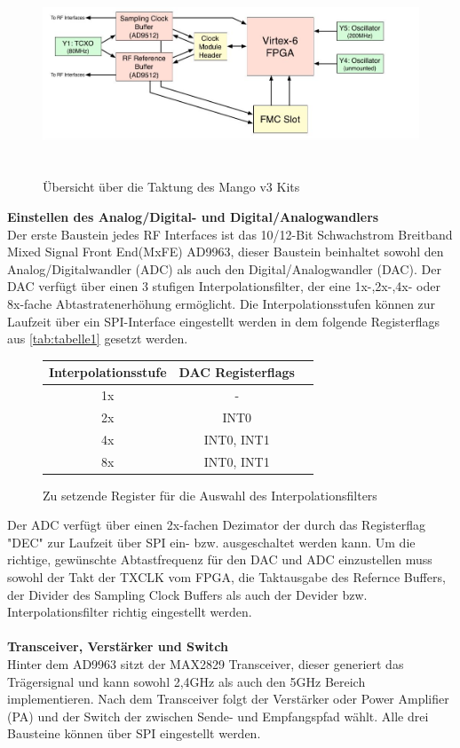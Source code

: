 \documentclass[letterpaper,11pt,ngerman]{article}
\begin{document}
\begin{onehalfspace}
\begin{figure}[H]
\begin{center}
\includegraphics[width = 16cm,height=6cm]{Unbenannt.jpg}
\caption{Übersicht über die Taktung des Mango v3 Kits \cite{[4]}}
\label{fig4}
\end{center}
\end{figure}
\noindent\textbf{Einstellen des Analog/Digital- und Digital/Analogwandlers}\\
Der erste Baustein jedes RF Interfaces ist das
10/12-Bit Schwachstrom Breitband Mixed Signal Front End(MxFE) AD9963, dieser Baustein beinhaltet sowohl den Analog/Digitalwandler (ADC) als auch den Digital/Analogwandler (DAC). Der DAC verfügt über einen 3 stufigen Interpolationsfilter, der eine 1x-,2x-,4x- oder 8x-fache Abtastratenerhöhung ermöglicht. Die Interpolationsstufen können zur Laufzeit über ein SPI-Interface eingestellt werden in dem folgende Registerflags aus \autoref{tab:tabelle1} gesetzt werden.
\begin{figure}[H]
\begin{center}
\begin{tabular}{|c|c|p{7cm}}\hline
\small
  \textbf{Interpolationsstufe} & \textbf{DAC Registerflags} \\ \hline
  1x & - \\\hline
  2x & INT0\\\hline
  4x & INT0, INT1 \\\hline
  8x & INT0, INT1 \\\hline
 \end{tabular}
 \caption{Zu setzende Register für die Auswahl des Interpolationsfilters}
  \label{tab:tabelle1}
  \end{center}
 \end{figure}
\noindent Der ADC verfügt über einen 2x-fachen Dezimator der durch das Registerflag "DEC" zur Laufzeit über SPI ein- bzw. ausgeschaltet werden kann.
Um die richtige, gewünschte Abtastfrequenz für den DAC und ADC einzustellen muss sowohl der Takt der TXCLK vom FPGA, die Taktausgabe des Refernce Buffers, der Divider des Sampling Clock Buffers als auch der Devider bzw. Interpolationsfilter richtig eingestellt werden.\\
\\
\noindent\textbf{Transceiver, Verstärker und Switch  }\\
Hinter dem AD9963 sitzt der MAX2829 Transceiver, dieser generiert das Trägersignal und kann sowohl 2,4GHz als auch den 5GHz Bereich implementieren. Nach dem Transceiver folgt der Verstärker oder Power Amplifier (PA) und der Switch der zwischen Sende- und Empfangspfad wählt. Alle drei Bausteine können über SPI eingestellt werden.


\end{onehalfspace}
\end{document}
